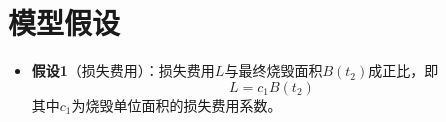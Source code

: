 \section{模型假设}\label{sec:Premise}

\begin{itemize}[leftmargin=2em]
    \item \textbf{假设1}（损失费用）：损失费用$L$与最终烧毁面积$B(t_2)$成正比，即
        \begin{equation}
            L = c_1 B(t_2)
        \end{equation}
        其中$c_1$为烧毁单位面积的损失费用系数。
\end{itemize}
